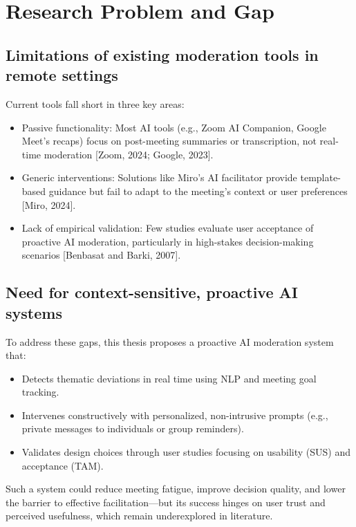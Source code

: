 \section{Research Problem and Gap}

\subsection{Limitations of existing moderation tools in remote settings}
Current tools fall short in three key areas:
\begin{itemize}
  \item Passive functionality: Most AI tools (e.g., Zoom AI Companion, Google Meet’s recaps) focus on
    post-meeting summaries or transcription, not real-time moderation [Zoom, 2024; Google, 2023].
  \item Generic interventions: Solutions like Miro’s AI facilitator provide template-based guidance but fail
    to adapt to the meeting’s context or user preferences [Miro, 2024].
  \item Lack of empirical validation: Few studies evaluate user acceptance of proactive AI moderation,
    particularly in high-stakes decision-making scenarios [Benbasat and Barki, 2007].
\end{itemize}

\subsection{Need for context-sensitive, proactive AI systems }
To address these gaps, this thesis proposes a proactive AI moderation system that:
\begin{itemize}
  \item Detects thematic deviations in real time using NLP and meeting goal tracking.
  \item Intervenes constructively with personalized, non-intrusive prompts (e.g., private messages to
    individuals or group reminders).
  \item Validates design choices through user studies focusing on usability (SUS) and acceptance (TAM).
\end{itemize}
Such a system could reduce meeting fatigue, improve decision quality, and lower the barrier to effective
facilitation—but its success hinges on user trust and perceived usefulness, which remain underexplored in literature.
